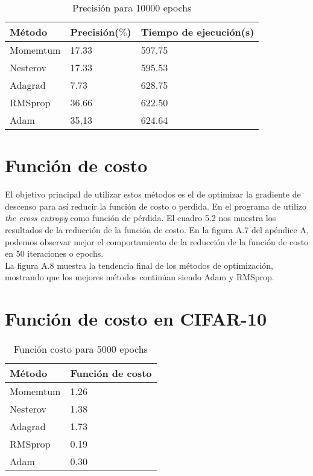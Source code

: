 \begin{table}[H]
	\centering
	\caption{Precisión para 10000 epochs}
	\label{my-label}
	\begin{centering}
		\begin{tabular}{@{}lll@{}}
			\toprule
			Método& Precisión($\%$)&  Tiempo de ejecución(s)  \\ \midrule
			Momemtum& 17.33  & 597.75\\
			Nesterov& 17.33 &  595.53\\
			Adagrad&7.73  &  628.75 \\
			RMSprop& 36.66 &  622.50\\
			Adam& 35,13 & 624.64 \\ \bottomrule
		\end{tabular}
	\end{centering}
	
\end{table}

\section{Función de costo}

El objetivo principal de utilizar estos métodos es el de optimizar la gradiente de descenso para así reducir la función de costo o perdida. En el programa de utilizo \textit{the cross entropy} como función de pérdida.
El cuadro 5.2 nos muestra los resultados de la reducción de la función de costo. En la figura A.7 del apéndice A, podemos observar mejor el comportamiento de la reducción de la función de costo en 50 iteraciones o epochs.\\
La figura A.8 muestra la tendencia final de los métodos de optimización, mostrando que los mejores métodos continúan siendo Adam y RMSprop. 
\section{Función de costo en CIFAR-10}
\begin{table}[H]
	\centering
	\caption{Función costo para 5000 epochs}
	\label{my-label}
	\begin{centering}
		\begin{tabular}{@{}ll@{}}
			\toprule
			Método& Función de costo\\ \midrule
			Momemtum& 1.26 \\
			Nesterov& 1.38\\
			Adagrad&1.73   \\
			RMSprop& 0.19 \\
			Adam& 0.30 \\ \bottomrule
		\end{tabular}
	\end{centering}
	
\end{table}



